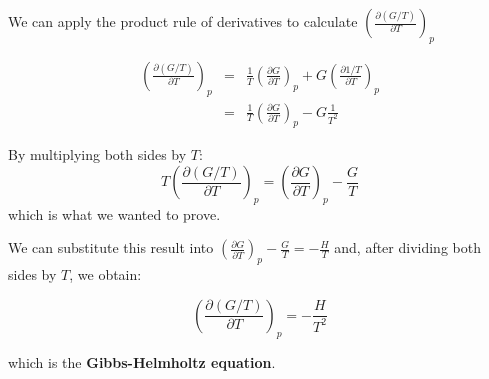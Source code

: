\documentclass[12pt,a4paper]{report}
\newif\ifstudents
\begin{document}
   We can apply the product rule of derivatives to calculate $\left(\frac{\partial (G/T)}{\partial T}\right)_{p}$
   \ifstudents \hideit[2]{ \fi

   \begin{eqnarray*}
   \left(\frac{\partial (G/T)}{\partial T}\right)_{p} &=& \frac{1}{T} \left(\frac{\partial G}{\partial T}\right)_{p} + G \left(\frac{\partial 1/T}{\partial T}\right)_{p}\\
   &=& \frac{1}{T} \left(\frac{\partial G}{\partial T}\right)_{p} -G \frac{1}{T^{2}}
   \end{eqnarray*}
      
   \ifstudents } \fi
   By multiplying both sides by $T$:
   \begin{equation*}
   T \left(\frac{\partial (G/T)}{\partial T}\right)_{p} = \left(\frac{\partial G}{\partial T}\right)_{p} - \frac{G}{T}
   \end{equation*}
   which is what we wanted to prove.
   
   We can substitute this result into $\left(\frac{\partial G}{\partial T}\right)_{p} -\frac{G}{T} =-\frac{H}{T}$ and, after dividing both sides by $T$, we obtain:
   \ifstudents \hideit[2]{ \fi
   \begin{equation*}
   \left(\frac{\partial (G/T)}{\partial T}\right)_{p} = -\frac{H}{T^{2}}
   \end{equation*}
   \ifstudents } \fi
   which is the \textbf{Gibbs-Helmholtz equation}.
\end{document}

